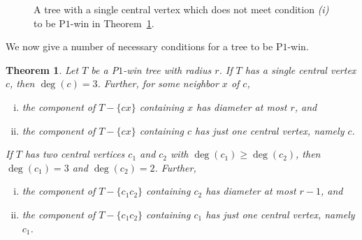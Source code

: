 \documentclass{article}
\theoremstyle{plain}
\newtheorem{theorem}{Theorem}
\theoremstyle{definition}
\def\pone{{\rm{P}\ensuremath{1}}}
\def\ptwo{{\rm{P}\ensuremath{2}}}
\begin{document}
\begin{figure}
    \centering
    \caption{A tree with a single central vertex which does not meet condition {\em (i)} to be \pone{}-win in Theorem~\ref{thm tree characterization}.}
    \label{fig:behind_the_back}
\end{figure}

We now give a number of necessary conditions for a tree to be \pone{}-win.


\begin{theorem}\label{thm tree characterization}
    Let $T$ be a \pone{}-win tree with radius $r$.
    If $T$ has a single central vertex $c$, then $\deg(c) = 3$. Further, for some neighbor $x$ of $c$, 
    \begin{enumerate}[(i)]
        \item the component of $T - \{cx\}$ containing $x$ has diameter at most $r$, and
        \item 
        the component of $T - \{cx\}$ containing $c$ has just one central vertex, namely $c$.
    \end{enumerate}
    If $T$ has two central vertices $c_1$ and $c_2$ with $\deg(c_1) \geq \deg(c_2)$, then $\deg(c_1) = 3$ and $\deg(c_2) = 2$. Further, 
    \begin{enumerate}[(i)]
        \item[(iii)] the component of $T - \{c_1c_2\}$ containing $c_2$ has diameter at most $r-1$, and
        \item[(iv)] the component of $T-\{c_1c_2\}$ containing $c_1$ has just one central vertex, namely $c_1$. 
    \end{enumerate}
    
\end{theorem}
\end{document}

